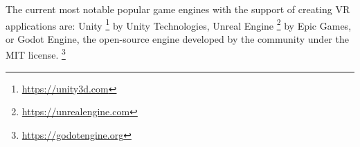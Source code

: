 The current most notable popular game engines with the support of creating VR
applications are: Unity \footnote{\href{https://unity3d.com}{https://unity3d.com}} by
Unity Technologies, Unreal Engine \footnote{\href{https://unrealengine.com}{https://unrealengine.com}} by
Epic Games, or Godot Engine, the open-source engine developed by the community
under the MIT license. \footnote{\href{https://godotengine.org}{https://godotengine.org}} \cite{slantvr}
